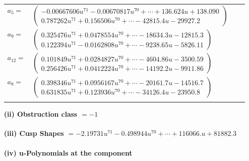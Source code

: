 \documentclass[1p]{elsarticle_modified}
\theoremstyle{definition}
\begin{document}
\begin{tabular}{m{7pt} m{180pt} m{7pt} m{180pt} }
\flushright $a_{5}=$&$\begin{pmatrix}-0.00667606 u^{71}-0.00670817 u^{70}+\cdots+136.624 u+138.090\\0.787262 u^{71}+0.156506 u^{70}+\cdots-42815.4 u-29927.2\end{pmatrix}$ \\
\flushright $a_{9}=$&$\begin{pmatrix}0.325476 u^{71}+0.0478554 u^{70}+\cdots-18634.3 u-12815.3\\0.122394 u^{71}-0.0162808 u^{70}+\cdots-9238.65 u-5826.11\end{pmatrix}$ \\
\flushright $a_{12}=$&$\begin{pmatrix}0.101849 u^{71}+0.0284827 u^{70}+\cdots-4604.86 u-3500.59\\0.256426 u^{71}+0.0412224 u^{70}+\cdots-14192.2 u-9911.86\end{pmatrix}$ \\
\flushright $a_{8}=$&$\begin{pmatrix}0.398346 u^{71}+0.0956167 u^{70}+\cdots-20161.7 u-14516.7\\0.631835 u^{71}+0.123936 u^{70}+\cdots-34126.4 u-23950.8\end{pmatrix}$\\&\end{tabular}
\flushleft \textbf{(ii) Obstruction class $= -1$}\\~\\
\flushleft \textbf{(iii) Cusp Shapes $= -2.19731 u^{71}-0.498944 u^{70}+\cdots+116066. u+81882.3$}\\~\\
\newpage\renewcommand{\arraystretch}{1}
\flushleft \textbf{(iv) u-Polynomials at the component}\newline \\
\end{document}
